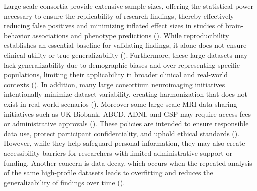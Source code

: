 Large-scale consortia provide extensive sample sizes, offering the statistical 
power necessary to ensure the replicability of research findings, 
thereby effectively reducing false positives and minimizing inflated effect 
sizes in studies of brain-behavior associations and phenotype predictions (\cite{marek2024replicability}). 
While reproducibility establishes an essential baseline for validating findings, 
it alone does not ensure clinical utility or true generalizability (\cite{kiar2024experimental}). 
Furthermore, these large datasets may lack generalizability due to demographic biases 
and over-representing specific populations, limiting their applicability in broader clinical 
and real-world contexts (\cite{marek2024replicability, yang2024limits}).
In addition, many large consortium neuroimaging initiatives intentionally 
minimize dataset variability, creating harmonization that 
does not exist in real-world scenarios (\cite{adkinson2024brain}). 
Moreover some large-scale MRI data-sharing initiatives such as UK Biobank, ABCD, ADNI, and GSP 
may require access fees or administrative approvals (\cite{miller2016multimodal, casey2018adolescent, mueller2005alzheimer,   holmes2015brain}). 
These policies are intended to ensure responsible data use, 
protect participant confidentiality, and uphold ethical standards (\cite{white2022data}). 
However, while they help safeguard personal information, they may also create accessibility barriers 
for researchers with limited administrative support or funding.
Another concern is data decay, which occurs when the repeated analysis 
of the same high-profile datasets leads to overfitting and reduces 
the generalizability of findings over time (\cite{thompson2020dataset, horien2021hitchhiker}).

